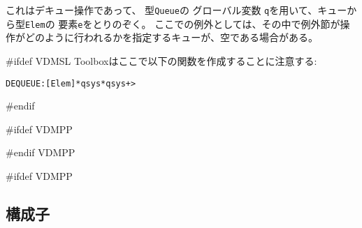 \documentclass[\pformat,12pt]{jarticle}
\begin{document}
\begin{description}
これはデキュー操作であって、 型{\tt Queue}の グローバル変数 {\tt q}を用いて、キューから型{\tt Elem}の 要素{\tt e}をとりのぞく。 
ここでの例外としては、その中で例外節が操作がどのように行われるかを指定するキューが、空である場合がある。

#ifdef VDMSL
Toolboxはここで以下の関数を作成することに注意する:
\begin{alltt}
  DEQUEUE: [Elem] * qsys * qsys +> 
\end{alltt}
#endif

#ifdef VDMPP

%
%

#endif VDMPP

\end{description}

#ifdef VDMPP
\subsection{構成子}\label{constructors}
\end{document}
